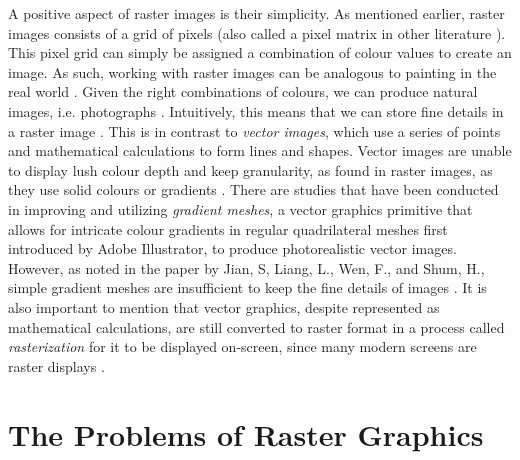 A positive aspect of raster images is their simplicity. As mentioned earlier, raster images consists of a grid of pixels (also called a pixel matrix in other literature \cite{realtimevectorizationgpu}). This pixel grid can simply be assigned a combination of colour values to create an image. As such, working with raster images can be analogous to painting in the real world \cite{rastervsvector}. Given the right combinations of colours, we can produce natural images, i.e. photographs \cite{hoshyari2018perceptiondriven}. Intuitively, this means that we can store fine details in a raster image \cite{optimizedgradientmeshes}. This is in contrast to \textit{vector images}, which use a series of points and mathematical calculations to form lines and shapes. Vector images are unable to display lush colour depth and keep granularity, as found in raster images, as they use solid colours or gradients  \cite{rastervsvector}\cite{rastervsvectorgraphics}. There are studies that have been conducted in improving and utilizing \textit{gradient meshes}, a vector graphics primitive that allows for intricate colour gradients in regular quadrilateral meshes first introduced by Adobe Illustrator, to produce photorealistic vector images. However, as noted in the paper by Jian, S, Liang, L., Wen, F., and Shum, H., simple gradient meshes are insufficient to keep the fine details of images \cite{barendrecht2018locally}\cite{optimizedgradientmeshes}. It is also important to mention that vector graphics, despite represented as mathematical calculations, are still converted to raster format in a process called \textit{rasterization} for it to be displayed on-screen, since many modern screens are raster displays \cite{howdovectorgraphciswork}.

\section{The Problems of Raster Graphics}




